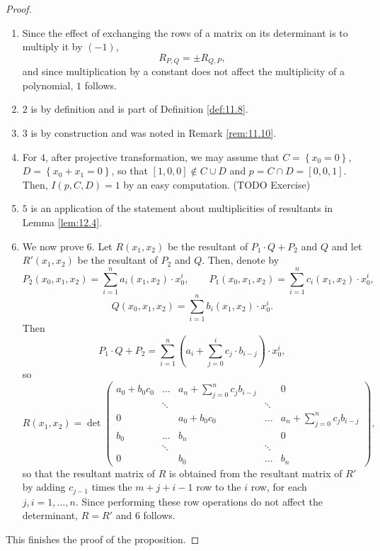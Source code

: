 \documentclass{article}
\newcommand{\rb}[1]{\left( #1 \right)}
\renewcommand{\sb}[1]{\left[ #1 \right]}
\newcommand{\cb}[1]{\left\{ #1 \right\}}
\theoremstyle{definition}\newtheorem{definition}{Definition}[section]
\theoremstyle{definition}\newtheorem{notation}[definition]{Notation}
\theoremstyle{definition}\newtheorem{remark}[definition]{Remark}
\theoremstyle{definition}\newtheorem{example}[definition]{Example}
\theoremstyle{definition}\newtheorem{fact}{Fact}
\theoremstyle{definition}\newtheorem{exercise}{Exercise}
\begin{document}
\begin{proof}
\hfill
\begin{enumerate}
\item Since the effect of exchanging the rows of a matrix on its determinant is to multiply it by $ \rb{-1} $,
$$ R_{P, Q} = \pm R_{Q, P}, $$
and since multiplication by a constant does not affect the multiplicity of a polynomial, $ 1 $ follows.
\item $ 2 $ is by definition and is part of Definition \ref{def:11.8}.
\item $ 3 $ is by construction and was noted in Remark \ref{rem:11.10}.
\item For $ 4 $, after projective transformation, we may assume that $ C = \cb{x_0 = 0} $, $ D = \cb{x_0 + x_1 = 0} $, so that $ \sb{1, 0, 0} \notin C \cup D $ and $ p = C \cap D = \sb{0, 0, 1} $. Then, $ I\rb{p, C, D} = 1 $ by an easy computation. (TODO Exercise)
\item $ 5 $ is an application of the statement about multiplicities of resultants in Lemma \ref{lem:12.4}.
\item We now prove $ 6 $. Let $ R\rb{x_1, x_2} $ be the resultant of $ P_1 \cdot Q + P_2 $ and $ Q $ and let $ R'\rb{x_1, x_2} $ be the resultant of $ P_2 $ and $ Q $. Then, denote by
$$ P_2\rb{x_0, x_1, x_2} = \sum_{i = 1}^n a_i\rb{x_1, x_2} \cdot x_0^i, \qquad P_1\rb{x_0, x_1, x_2} = \sum_{i = 1}^n c_i\rb{x_1, x_2} \cdot x_0^i, $$
$$ Q\rb{x_0, x_1, x_2} = \sum_{i = 1}^n b_i\rb{x_1, x_2} \cdot x_0^i. $$
Then
$$ P_1 \cdot Q + P_2 = \sum_{i = 1}^n \rb{a_i + \sum_{j = 0}^i c_j \cdot b_{i - j}} \cdot x_0^i, $$
so
$$ R\rb{x_1, x_2} = \det\begin{pmatrix} a_0 + b_0c_0 & \dots & a_n + \sum_{j = 0}^n c_jb_{i - j} & & 0 \\ & \ddots & & \ddots & \\ 0 & & a_0 + b_0c_0 & \dots & a_n + \sum_{j = 0}^n c_jb_{i - j} \\ b_0 & \dots & b_n & & 0 \\ & \ddots & & \ddots & \\ 0 & & b_0 & \dots & b_n \end{pmatrix}, $$
so that the resultant matrix of $ R $ is obtained from the resultant matrix of $ R' $ by adding $ c_{j - 1} $ times the $ m + j + i - 1 $ row to the $ i $ row, for each $ j, i = 1, \dots, n $. Since performing these row operations do not affect the determinant, $ R = R' $ and $ 6 $ follows.
\end{enumerate}
This finishes the proof of the proposition.
\end{proof}
\end{document}
